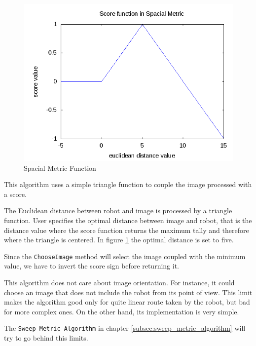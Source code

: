 \begin{figure}[!h]
  \begin{center}
    \includegraphics[width=400pt]{img/spacialMetricFunc.png} 
    \caption{Spacial Metric Function}
    \label{fig:spacial_metric_func}
  \end{center}
\end{figure}

This algorithm uses a simple triangle function to couple the image processed with a score.
%

%
The Euclidean distance between robot and image is processed by a triangle function. User specifies
the optimal distance between image and robot, that is the distance value where
the score function returns the maximum tally and therefore where the triangle is centered.
In figure \ref{fig:spacial_metric_func} the optimal distance is set to five.
%

%
Since the \texttt{ChooseImage} method will select the image coupled with the minimum value, we have
to invert the score sign before returning it.
%

%
This algorithm does not care about image orientation. For instance, it could choose an image that
does not include the robot from its point of view. This limit makes the algorithm good only for
quite linear route taken by the robot, but bad for more complex ones. On the other hand, its
implementation is very simple.
%

%
The \texttt{Sweep Metric Algorithm} in chapter \ref{subsec:sweep_metric_algorithm} will try to
go behind this limits.



